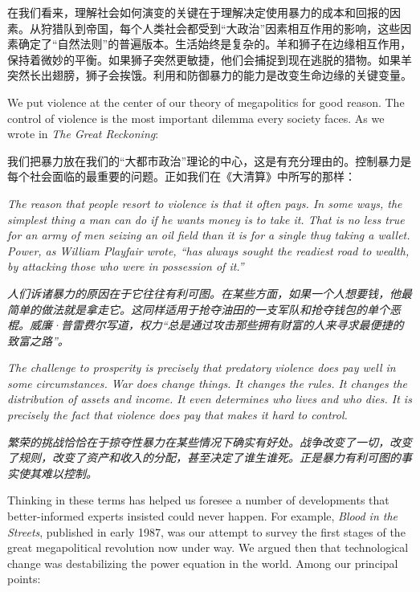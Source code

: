 \begin{paracol}{2}
	\switchcolumn
    在我们看来，理解社会如何演变的关键在于理解决定使用暴力的成本和回报的因素。从狩猎队到帝国，每个人类社会都受到“大政治”因素相互作用的影响，这些因素确定了“自然法则”的普遍版本。生活始终是复杂的。羊和狮子在边缘相互作用，保持着微妙的平衡。如果狮子突然更敏捷，他们会捕捉到现在逃脱的猎物。如果羊突然长出翅膀，狮子会挨饿。利用和防御暴力的能力是改变生命边缘的关键变量。
	
	\switchcolumn*
	We put violence at the center of our theory of megapolitics for good reason. The control of violence is the most important dilemma every society faces. As we wrote in \emph{The Great Reckoning}:
	
	\switchcolumn
	我们把暴力放在我们的“大都市政治”理论的中心，这是有充分理由的。控制暴力是每个社会面临的最重要的问题。正如我们在《大清算》中所写的那样：
	
	\switchcolumn*
	\emph{The reason that people resort to violence is that it often pays. In some ways, the simplest thing a man can do if he wants money is to take it. That is no less true for an army of men seizing an oil field than it is for a single thug taking a wallet. Power, as William Playfair wrote, ``has always sought the readiest road to wealth, by attacking those who were in possession of it.'' }
	
	\switchcolumn
	\emph{人们诉诸暴力的原因在于它往往有利可图。在某些方面，如果一个人想要钱，他最简单的做法就是拿走它。这同样适用于抢夺油田的一支军队和抢夺钱包的单个恶棍。威廉·普雷费尔写道，权力“总是通过攻击那些拥有财富的人来寻求最便捷的致富之路”。}
	
	\switchcolumn
	\emph{The challenge to prosperity is precisely that predatory violence does pay well in some circumstances. War does change things. It changes the rules. It changes the distribution of assets and income. It even determines who lives and who dies. It is precisely the fact that violence does pay that makes it hard to control.}
	
	\switchcolumn
	\emph{繁荣的挑战恰恰在于掠夺性暴力在某些情况下确实有好处。战争改变了一切，改变了规则，改变了资产和收入的分配，甚至决定了谁生谁死。正是暴力有利可图的事实使其难以控制。}
	
	\switchcolumn
	Thinking in these terms has helped us foresee a number of developments that better-informed experts insisted could never happen. For example, \emph{Blood in the Streets}, published in early 1987, was our attempt to survey the first stages of the great megapolitical revolution now under way. We argued then that technological change was destabilizing the power equation in the world. Among our principal points:
	

\end{paracol}
